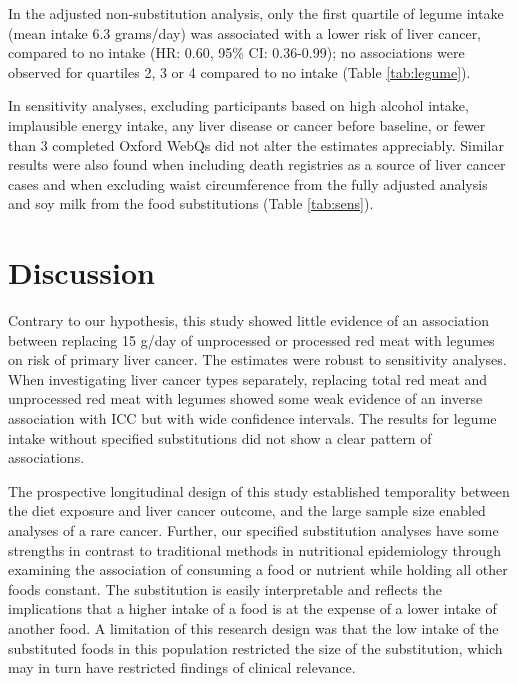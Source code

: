 \documentclass[
]{article}
\begin{document}
In the adjusted non-substitution analysis, only the first quartile of
legume intake (mean intake 6.3 grams/day) was associated with a lower
risk of liver cancer, compared to no intake
(HR: 0.60, 95\% CI: 0.36-0.99);
no associations were observed for quartiles 2, 3 or 4 compared to no
intake (Table \ref{tab:legume}).

In sensitivity analyses, excluding participants based on high alcohol
intake, implausible energy intake, any liver disease or cancer before
baseline, or fewer than 3 completed Oxford WebQs did not alter the
estimates appreciably. Similar results were also found when including
death registries as a source of liver cancer cases and when excluding
waist circumference from the fully adjusted analysis and soy milk from
the food substitutions (Table \ref{tab:sens}).

\hypertarget{sec4}{%
\section{Discussion}\label{sec4}}

Contrary to our hypothesis, this study showed little evidence of an
association between replacing 15 g/day of unprocessed or processed red
meat with legumes on risk of primary liver cancer. The estimates were
robust to sensitivity analyses. When investigating liver cancer types
separately, replacing total red meat and unprocessed red meat with
legumes showed some weak evidence of an inverse association with ICC but
with wide confidence intervals. The results for legume intake without
specified substitutions did not show a clear pattern of associations.

The prospective longitudinal design of this study established
temporality between the diet exposure and liver cancer outcome, and the
large sample size enabled analyses of a rare cancer. Further, our
specified substitution analyses have some strengths in contrast to
traditional methods in nutritional epidemiology through examining the
association of consuming a food or nutrient while holding all other
foods constant. The substitution is easily interpretable and reflects
the implications that a higher intake of a food is at the expense of a
lower intake of another food. A limitation of this research design was
that the low intake of the substituted foods in this population
restricted the size of the substitution, which may in turn have
restricted findings of clinical relevance.
\end{document}
